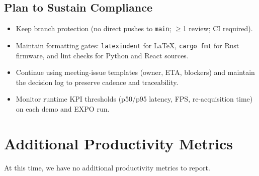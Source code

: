 \documentclass{article}
\begin{document}
\subsection*{Plan to Sustain Compliance}
\begin{itemize}
  \item Keep branch protection (no direct pushes to \texttt{main}; $\geq$1 review; CI
        required).
  \item Maintain formatting gates: \texttt{latexindent} for LaTeX, \texttt{cargo fmt}
        for Rust firmware, and lint checks for Python and React sources.
  \item Continue using meeting-issue templates (owner, ETA, blockers) and maintain the
        decision log to preserve cadence and traceability.
  \item Monitor runtime KPI thresholds (p50/p95 latency, FPS, re-acquisition time) on
        each demo and EXPO run.
\end{itemize}

\section{Additional Productivity Metrics}

At this time, we have no additional productivity metrics to report.
\end{document}
